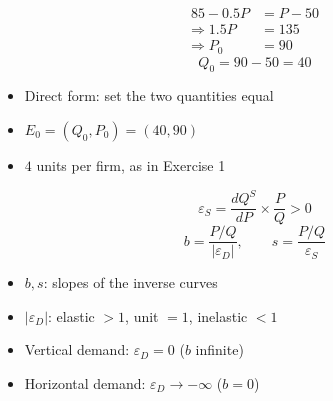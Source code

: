 \begin{frame}[plain,label=w2_11_we3b]
  \Large
  \begin{align*}
    \tag{35}\;85 - 0.5P &= P - 50\\
    \Rightarrow 1.5P &= 135\\
    \Rightarrow P_0 &= 90
  \end{align*}
  \[
    \tag{36}\;Q_0 = 90 - 50 = 40
  \]

  \vspace{0.3em}
  \begin{itemize}\Large
    \item Direct form: set the two quantities equal
    \item $E_0 = (Q_0, P_0) = (40, 90)$
    \item $4$ units per firm, as in Exercise 1
  \end{itemize}
\end{frame}

\begin{frame}[plain,label=w2_14_elast_read]
  \Large
  \[
    \tag{42}\;\varepsilon_S = \frac{dQ^S}{dP} \times \frac{P}{Q} > 0
  \]
  \[
    \tag{43}\;b = \frac{P/Q}{|\varepsilon_D|}, \qquad s = \frac{P/Q}{\varepsilon_S}
  \]

  \vspace{0.3em}
  \begin{itemize}\Large
    \item $b, s$: slopes of the inverse curves
    \item $|\varepsilon_D|$: elastic $> 1$, unit $= 1$, inelastic $< 1$
    \item Vertical demand: $\varepsilon_D = 0$ ($b$ infinite)
    \item Horizontal demand: $\varepsilon_D \to -\infty$ ($b = 0$)
  \end{itemize}
\end{frame}

